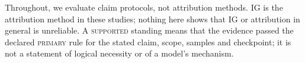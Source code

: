 Throughout, we evaluate claim protocols, not attribution methods. IG is the attribution method in these studies; nothing here shows that IG or attribution in general is unreliable. A \textsc{supported} standing means that the evidence passed the declared \textsc{primary} rule for the stated claim, scope, samples and checkpoint; it is not a statement of logical necessity or of a model's mechanism.
